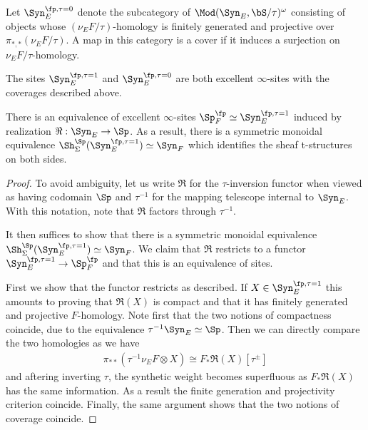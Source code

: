   \begin{definition}
    Let $\Syn_E^{\fp, \tau=0}$ denote the subcategory of $\Mod(\Syn_E, \bS/\tau)^\omega$ consisting of objects whose $(\nu_E F/\tau)$-homology is finitely generated and projective over $\pi_{*,*}(\nu_E F/ \tau)$. A map in this category is a cover if it induces a surjection on $\nu_E F/ \tau$-homology.
  \end{definition}
  
  \begin{lemma}
    The sites $\Syn_E^{\fp, \tau=1}$ and $\Syn_E^{\fp, \tau=0}$ are both excellent $\infty$-sites with the coverages described above.
  \end{lemma}
  
  \begin{proposition}\label{prop:spfpissyntauone}
    There is an equivalence of excellent $\infty$-sites $\Sp^\fp_F\simeq \Syn_E^{\fp, \tau=1}$ induced by realization $\Re:\Syn_E\to \Sp$. As a result, there is a symmetric monoidal equivalence $\Sh_\Sigma^\Sp(\Syn_E^{\fp, \tau=1})\simeq \Syn_F$ which identifies the sheaf t-structures on both sides.
  \end{proposition}
  
  \begin{proof}
    To avoid ambiguity, let us write $\Re$ for the $\tau$-inversion functor when viewed as having codomain $\Sp$ and $\tau^{-1}$ for the mapping telescope internal to $\Syn_E$. With this notation, note that $\Re$ factors through $\tau^{-1}$.
    
    
    It then suffices to show that there is a symmetric monoidal equivalence $\Sh_{\Sigma}^\Sp(\Syn_E^{\fp, \tau=1})\simeq \Syn_F$. We claim that $\Re$ restricts to a functor $\Syn_E^{\fp, \tau=1}\to \Sp^\fp_F$ and that this is an equivalence of sites. 
  
    First we show that the functor restricts as described. If $X\in \Syn_E^{\fp, \tau=1}$ this amounts to proving that $\Re(X)$ is compact and that it has finitely generated and projective $F$-homology. Note first that the two notions of compactness coincide, due to the equivalence $\tau^{-1}\Syn_E\simeq \Sp$. Then we can directly compare the two homologies as we have
    \begin{align*}
      \pi_{**}(\tau^{-1}\nu_E F\otimes X)\cong F_*\Re(X)[\tau^{\pm}]
    \end{align*}
    and aftering inverting $\tau$, the synthetic weight becomes superfluous as $F_*\Re(X)$ has the same information. As a result the finite generation and projectivity criterion coincide. Finally, the same argument shows that the two notions of coverage coincide.
  \end{proof}
  
